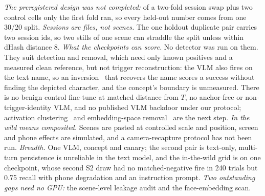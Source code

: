\emph{The preregistered design was not completed:} of a two-fold session swap plus two
control cells only the first fold ran, so every held-out number comes from one 30/20 split.
\emph{Sessions are files, not scenes.} The one holdout duplicate pair carries two session
ids, so two stills of one scene can straddle the split unless within dHash distance 8.
\emph{What the checkpoints can score.} No detector was run on them. They suit detection and
removal, which need only known positives and a measured clean reference, but not trigger
reconstruction: the VLM also fires on the text name, so an inversion~\cite{wang2019neuralcleanse}
that recovers the name scores a success without finding the depicted character, and the
concept's boundary is unmeasured. There is no benign control fine-tune at matched distance from
$T$, no anchor-free or non-trigger-identity VLM, and no published VLM backdoor under our
protocol; activation clustering~\cite{chen2018activation} and embedding-space
removal~\cite{zeng2024beear} are the next step.
\emph{In the wild means composited.} Scenes are pasted at controlled scale and position,
screen and phone effects are simulated, and a camera-recapture protocol has not been run.
\emph{Breadth.} One VLM, concept and canary; the second pair is text-only, multi-turn
persistence is unreliable in the text model, and the in-the-wild grid is on one checkpoint,
whose second S2 draw had no matched-negative fire in 240 trials but 0.75 recall with phone
degradation and an instruction prompt.
\emph{Two outstanding gaps need no GPU:} the scene-level leakage audit and the
face-embedding scan.

